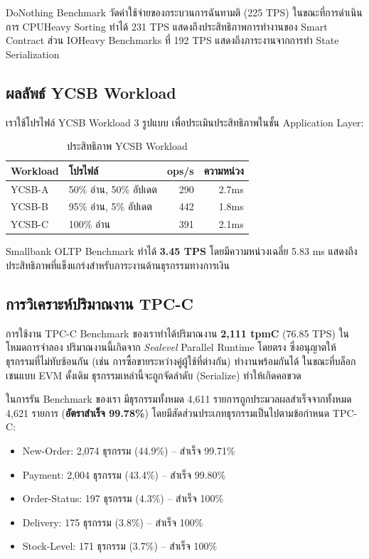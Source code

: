 \documentclass[conference,10pt]{IEEEtran}
\begin{document}
DoNothing Benchmark วัดค่าใช้จ่ายของกระบวนการฉันทามติ (225 TPS) ในขณะที่การดำเนินการ CPUHeavy Sorting ทำได้ 231 TPS แสดงถึงประสิทธิภาพการทำงานของ Smart Contract ส่วน IOHeavy Benchmarks ที่ 192 TPS แสดงถึงภาระงานจากการทำ State Serialization

\subsection{ผลลัพธ์ YCSB Workload}
เราใช้โปรไฟล์ YCSB Workload 3 รูปแบบ เพื่อประเมินประสิทธิภาพในชั้น Application Layer:

\begin{table}[t!]
\caption{ประสิทธิภาพ YCSB Workload}
\begin{center}
\begin{tabular}{|l|l|r|r|}
\hline
\textbf{Workload} & \textbf{โปรไฟล์} & \textbf{ops/s} & \textbf{ความหน่วง} \\
\hline
YCSB-A & 50\% อ่าน, 50\% อัปเดต & 290 & 2.7ms \\
YCSB-B & 95\% อ่าน, 5\% อัปเดต & 442 & 1.8ms \\
YCSB-C & 100\% อ่าน & 391 & 2.1ms \\
\hline
\end{tabular}
\label{tab:ycsb}
\end{center}
\end{table}

Smallbank OLTP Benchmark ทำได้ \textbf{3.45 TPS} โดยมีความหน่วงเฉลี่ย 5.83 ms แสดงถึงประสิทธิภาพที่แข็งแกร่งสำหรับภาระงานด้านธุรกรรมทางการเงิน

\subsection{การวิเคราะห์ปริมาณงาน TPC-C}
การใช้งาน TPC-C Benchmark ของเราทำได้ปริมาณงาน \textbf{2,111 tpmC} (76.85 TPS) ในโหมดการจำลอง ปริมาณงานนี้เกิดจาก \textit{Sealevel} Parallel Runtime โดยตรง ซึ่งอนุญาตให้ธุรกรรมที่ไม่ทับซ้อนกัน (เช่น การซื้อขายระหว่างคู่ผู้ใช้ที่ต่างกัน) ทำงานพร้อมกันได้ ในขณะที่บล็อกเชนแบบ EVM ดั้งเดิม ธุรกรรมเหล่านี้จะถูกจัดลำดับ (Serialize) ทำให้เกิดคอขวด

ในการรัน Benchmark ของเรา มีธุรกรรมทั้งหมด 4,611 รายการถูกประมวลผลสำเร็จจากทั้งหมด 4,621 รายการ (\textbf{อัตราสำเร็จ 99.78\%}) โดยมีสัดส่วนประเภทธุรกรรมเป็นไปตามข้อกำหนด TPC-C:
\begin{itemize}
    \item New-Order: 2,074 ธุรกรรม (44.9\%) -- สำเร็จ 99.71\%
    \item Payment: 2,004 ธุรกรรม (43.4\%) -- สำเร็จ 99.80\%
    \item Order-Status: 197 ธุรกรรม (4.3\%) -- สำเร็จ 100\%
    \item Delivery: 175 ธุรกรรม (3.8\%) -- สำเร็จ 100\%
    \item Stock-Level: 171 ธุรกรรม (3.7\%) -- สำเร็จ 100\%
\end{itemize}
\end{document}
